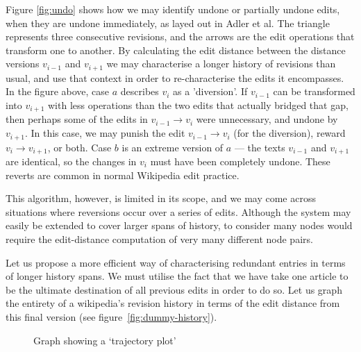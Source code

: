 Figure \ref{fig:undo} shows how we may identify undone or partially
undone edits, when they are undone immediately, as layed out in Adler
et al.\cite{Adler2007} The triangle represents three consecutive
revisions, and the arrows are the edit operations that transform one
to another. By calculating the edit distance between the distance
versions $v_{i-1}$ and $v_{i+1}$ we may characterise a longer history
of revisions than usual, and use that context in order to
re-characterise the edits it encompasses. In the figure above, case
$a$ describes $v_i$ as a 'diversion'. If $v_{i-1}$ can be transformed
into $v_{i+1}$ with less operations than the two edits that actually
bridged that gap, then perhaps some of the edits in $v_{i-1}
\rightarrow v_i$ were unnecessary, and undone by $v_{i+1}$. In this
case, we may punish the edit $v_{i-1} \rightarrow v_i$ (for the
diversion), reward $v_{i} \rightarrow v_{i+1}$, or both. Case $b$ is
an extreme version of $a$ --- the texts $v_{i-1}$ and $v_{i+1}$ are
identical, so the changes in $v_i$ must have been completely
undone. These reverts are common in normal Wikipedia edit
practice.\cite{wiki-revert}

This algorithm, however, is limited in its scope, and we may
come across situations where reversions occur over a series of
edits. Although the system may easily be extended to cover
larger spans of history, to consider many nodes would require
the edit-distance computation of very many different node
pairs. 

Let us propose a more efficient way of characterising redundant
entries in terms of longer history spans. We must utilise the fact
that we have take one article to be the ultimate destination of all
previous edits in order to do so. Let us graph the entirety of a
wikipedia's revision history in terms of the edit distance from this
final version (see figure~\ref{fig:dummy-history}).

\begin{figure}
  \centering
  \pgfplotsset{width=0.4\textwidth}
  \caption{Graph showing a `trajectory plot'}
  \label{fig:dummy_history}
\end{figure}

